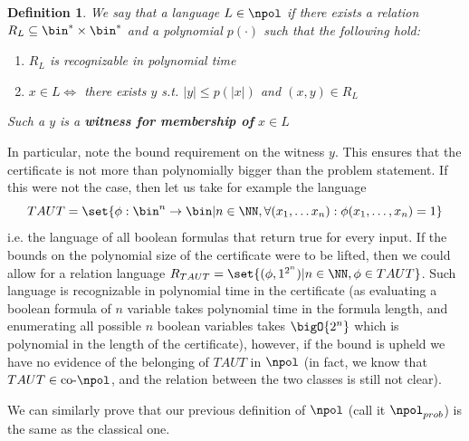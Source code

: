 \documentclass{article}
\newtheorem{definition}{Definition}
\begin{document}
\begin{definition}
    We say that a language $L \in \npol$ if there exists a relation $R_L \subseteq \bin^* \times \bin^*$ and a polynomial $p(\cdot)$ such that the following hold:
    \begin{enumerate}
        \item $R_L$ is recognizable in polynomial time
        \item $x \in L \iff$ there exists $y$ s.t. $|y| \leq p(|x|)$ and $(x, y) \in R_L$
    \end{enumerate}
    Such a $y$ is a \textbf{witness for membership of } $x \in L$
\end{definition}
In particular, note the bound requirement on the witness $y$. This ensures that the certificate is not more than polynomially bigger than the problem statement. If this were not the case, then let us take for example the language \[TAUT = \set{ \phi : \bin^n \to \bin | n \in \NN, \forall (x_1, \dots x_n): \phi(x_1, \dots, x_n) = 1}\]
i.e. the language of all boolean formulas that return true for every input. If the bounds on the polynomial size of the certificate were to be lifted, then we could allow for a relation language $R_{TAUT} = \set{ (\phi, 1^{2^n}) | n \in \NN, \phi \in TAUT  }$. Such language is recognizable in polynomial time in the certificate (as evaluating a boolean formula of $n$ variable takes polynomial time in the formula length, and enumerating all possible $n$ boolean variables takes $\bigO{2^n}$ which is polynomial in the length of the certificate), however, if the bound is upheld we have no evidence of the belonging of $TAUT$ in $\npol$ (in fact, we know that $TAUT \in \text{co-}\npol$, and the relation between the two classes is still not clear).

We can similarly prove that our previous definition of $\npol$ (call it $\npol_{prob}$) is the same as the classical one.
\end{document}
